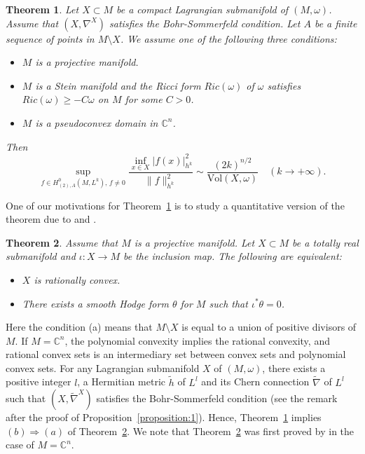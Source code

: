 \documentclass[12pt,oneside]{amsart}
\theoremstyle{plain}
\newtheorem{theorem}{Theorem}
\theoremstyle{definition}
\theoremstyle{remark}
\begin{document}
\begin{theorem}\label{theorem:3}
Let $X \subset M$ be a compact Lagrangian submanifold of $(M, \omega)$.  
Assume that $(X, \nabla^{X})$ satisfies the Bohr-Sommerfeld condition.  
Let $A$ be a finite sequence of points in $M \setminus X$.  
We assume one of the following three conditions:  
\begin{itemize}
\item[(i)]
$M$ is a projective manifold.  
\item[(ii)]
$M$ is a Stein manifold and the Ricci form $Ric(\omega)$ of $\omega$ satisfies 
$Ric(\omega) \geq -C \omega$ on $M$ for some $C > 0$.   
\item[(iii)]
$M$ is a pseudoconvex domain in $\mathbb{C}^n$.  
\end{itemize}
Then 
\begin{equation}\label{equation:a}
\sup_{f \in H^{0}_{(2), A}(M, L^k), \, f \neq 0} \frac{\inf_{x \in X} |f(x)|^2_{h^k}}{\|f\|^2_{h^k}} \sim \frac{(2k)^{n/2}}{\mathrm{Vol}(X, \omega)} \quad (k \to +\infty).  
\end{equation}
\end{theorem}

One of our motivations for Theorem~\ref{theorem:3} is to study a quantitative version of the theorem due to \cite{Duv-Sib} and \cite{Gue}.  

\begin{theorem}\label{theorem:2}
Assume that $M$ is a projective manifold.  
Let $X \subset M$ be a totally real submanifold and $\iota: X \to M$ be the inclusion map.  
The following are equivalent: 
\begin{itemize} 
\item[(a)] 
$X$ is rationally convex.  
\item[(b)]
There exists a smooth Hodge form $\theta$ for $M$ such that $\iota^{*} \theta = 0$.  
\end{itemize}
\end{theorem}
Here the condition (a) means that $M \setminus X$ is equal to a union of positive divisors of $M$.    
If $M = \mathbb{C}^n$, the polynomial convexity implies the rational convexity, and rational convex sets is an intermediary set between convex sets and polynomial convex sets.  
For any Lagrangian submanifold $X$ of $(M, \omega)$, 
there exists a positive integer $l$, a Hermitian metric $\tilde{h}$ of $L^l$ and its Chern connection $\widetilde{\nabla}$ of $L^l$ such that $(X, \widetilde{\nabla}^{X})$ satisfies the Bohr-Sommerfeld condition (see the remark after the proof of Proposition~\ref{proposition:1}).  
Hence, Theorem~\ref{theorem:3} implies $(b) \Rightarrow (a)$ of Theorem~\ref{theorem:2}.  
We note that Theorem~\ref{theorem:2} was first proved by \cite{Duv-Sib} in the case of $M = \mathbb{C}^n$.  
\end{document}
